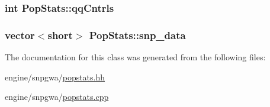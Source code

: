 \label{classPopStats_a5853b66b49a213cc8dda8438c2283691}
\hypertarget{classPopStats_a7670a2e68b37265b82b79da99140548e}{
\subsubsection[{qqCntrls}]{\setlength{\rightskip}{0pt plus 5cm}int {\bf PopStats::qqCntrls}}}
\label{classPopStats_a7670a2e68b37265b82b79da99140548e}
\hypertarget{classPopStats_aa9ae8c1f4f068085d3865bc95f3ad378}{
\subsubsection[{snp\_\-data}]{\setlength{\rightskip}{0pt plus 5cm}vector$<$short$>$ {\bf PopStats::snp\_\-data}}}
\label{classPopStats_aa9ae8c1f4f068085d3865bc95f3ad378}


The documentation for this class was generated from the following files:\begin{DoxyCompactItemize}
\item 
engine/snpgwa/\hyperlink{popstats_8hh}{popstats.hh}\item 
engine/snpgwa/\hyperlink{popstats_8cpp}{popstats.cpp}\end{DoxyCompactItemize}
